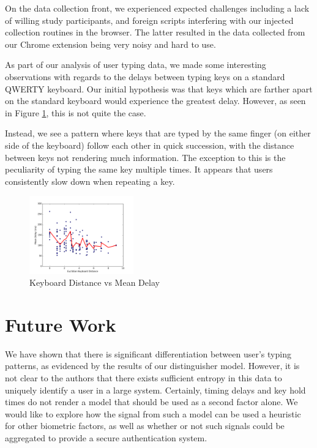 \documentclass[9pt,journal]{IEEEtran}
\begin{document}
On the data collection front, we experienced expected challenges including a lack of willing study participants, and foreign scripts interfering with our injected collection routines in the browser. The latter resulted in the data collected from our Chrome extension being very noisy and hard to use.

As part of our analysis of user typing data, we made some interesting observations with regards to the delays between typing keys on a standard QWERTY keyboard. Our initial hypothesis was that keys which are farther apart on the standard keyboard would experience the greatest delay. However, as seen in Figure \ref{fig:keyboard}, this is not quite the case.

Instead, we see a pattern where keys that are typed by the same finger (on either side of the keyboard) follow each other in quick succession, with the distance between keys not rendering much information. The exception to this is the peculiarity of typing the same key multiple times. It appears that users consistently slow down when repeating a key.

\begin{figure}[H]
  \centering
  \includegraphics[width=0.4\textwidth]{keyboard}
  \caption{Keyboard Distance vs Mean Delay}
  \label{fig:keyboard}
\end{figure}


\section{Future Work}

We have shown that there is significant differentiation between user's typing patterns, as evidenced by the results of our distinguisher model. However, it is not clear to the authors that there exists sufficient entropy in this data to uniquely identify a user in a large system. Certainly, timing delays and key hold times do not render a model that should be used as a second factor alone. We would like to explore how the signal from such a model can be used a heuristic for other biometric factors, as well as whether or not such signals could be aggregated to provide a secure authentication system.
\end{document}
